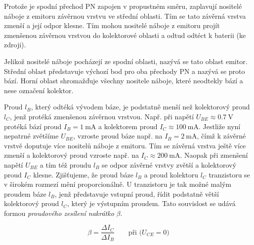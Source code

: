 {      
      
      Protože je spodní přechod PN zapojen v propustném směru, zaplavují nositelé náboje z emitoru
      závěrnou vrstvu ve střední oblasti. Tím se tato závěrná vrstva zmenší a její odpor klesne. Tím
      mohou nositelé náboje z emitoru projít zmenšenou závěrnou vrstvou do kolektorové oblasti a
      odtud odtéct k baterii (ke zdroji).

      Jelikož nositelé náboje pocházejí ze spodní oblasti, nazývá se tato oblast emitor. Střední
      oblast představuje výchozí bod pro oba přechody PN a nazývá se proto bází. Horní oblast
      shromažďuje všechny nositele náboje, které neodtekly bází a nese označení kolektor.

      
      Proud \(l_B\), který odtéká vývodem báze, je podstatně menší než kolektorový proud \(l_C\),
      jenž protéká zmenšenou závěrnou vrstvou. Např. při napětí \(U_{BE} \approx \SI{0.7}{\V}\)
      protéká bází proud \(I_B = \SI{1}{\mA}\) a kolektorem proud \(I_C \approx \SI{100}{\mA}\).
      Jestliže nyní nepatrné zvětšíme \(U_{BE}\), vzroste proud báze např. na \(I_B = \SI{2}{\mA}\),
      čímž k závěrné vrstvě doputuje více nositelů náboje z emitoru. Tím se závěrná vrstva ještě
      více zmenší a kolektorový proud vzroste např. na \(I_C \approx \SI{200}{\mA}\). Naopak při
      zmenšení napětí \(U_{BE}\) a tím též proudu \(l_B\) se odpor závěrné vrstvy zvětší a
      kolektorový proud \(I_C\) klesne. Zjišťujeme, že proud báze \(l_B\) a proud kolektoru \(l_C\)
      tranzistoru se v širokém rozmezí mění proporcionálně. U tranzistoru je tak možné malým proudem
      báze \(l_B\), jenž představuje vstupní proud, řídit podstatně větší kolektorový proud \(l_C\),
      který je výstupním proudem. Tato souvislost se udává formou \emph{proudového zesílení
      nakrátko} \(\beta\).

      \begin{equation*}
        \beta = \dfrac{\Delta I_C}{\Delta I_B} \qquad \text{při (\(U_{CE} = 0\))}
      \end{equation*}
        
      
}
